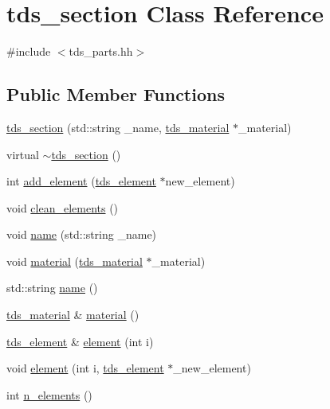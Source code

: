 \hypertarget{classtds__section}{}\section{tds\+\_\+section Class Reference}
\label{classtds__section}


{\ttfamily \#include $<$tds\+\_\+parts.\+hh$>$}

\subsection*{Public Member Functions}
\begin{DoxyCompactItemize}
\item 
\hyperlink{classtds__section_ab65969b3d4b2950a5f3d2178c92c6554}{tds\+\_\+section} (std\+::string \+\_\+name, \hyperlink{classtds__material}{tds\+\_\+material} $\ast$\+\_\+material)
\item 
virtual \hyperlink{classtds__section_aa81d43b2bda7a4bff6f21003f9dd6c62}{$\sim$tds\+\_\+section} ()
\item 
int \hyperlink{classtds__section_ac7f7a6748643e80fe3380c342e146cd7}{add\+\_\+element} (\hyperlink{classtds__element}{tds\+\_\+element} $\ast$new\+\_\+element)
\item 
void \hyperlink{classtds__section_ae177ecffb63403be5318c081340b0215}{clean\+\_\+elements} ()
\item 
void \hyperlink{classtds__section_ab5ed7bcffdcf61ac015a82c02cda876e}{name} (std\+::string \+\_\+name)
\item 
void \hyperlink{classtds__section_a6da38cfd02f9ef8f8d04fc71da2623fd}{material} (\hyperlink{classtds__material}{tds\+\_\+material} $\ast$\+\_\+material)
\item 
std\+::string \hyperlink{classtds__section_aee79d0125477377b79482b60fbc20fd5}{name} ()
\item 
\hyperlink{classtds__material}{tds\+\_\+material} \& \hyperlink{classtds__section_a0cfa87f9a83bc0535bb08bdbc5c8700c}{material} ()
\item 
\hyperlink{classtds__element}{tds\+\_\+element} \& \hyperlink{classtds__section_acd171d99c4648513baadcbfd994ea301}{element} (int i)
\item 
void \hyperlink{classtds__section_a429ae2483cc8952120b2a9d828aab405}{element} (int i, \hyperlink{classtds__element}{tds\+\_\+element} $\ast$\+\_\+new\+\_\+element)
\item 
int \hyperlink{classtds__section_a8aa5f42733f88e55f360f98aeb343890}{n\+\_\+elements} ()
\end{DoxyCompactItemize}


